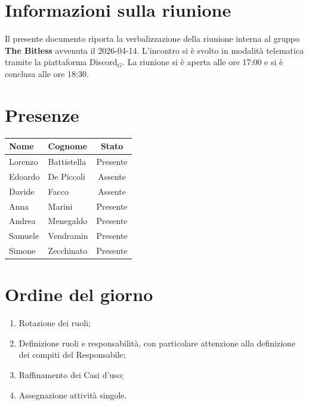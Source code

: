 \documentclass[a4paper, 10pt, colorlinks=true, linkcolor=black, urlcolor=blue, citecolor=blue, hidelinks]{article}
\begin{document}
\newcommand{\titolo}{Verbale interno}
\newcommand{\dataverbale}{2026-04-14}
\newcommand{\dataversione}{2026-04-19}
\newcommand{\versione}{1.0.0}
\newcommand{\stato}{Stesura}
\newcommand{\destinatari}{The Bitless, prof. Tullio Vardanega, prof. Riccardo Cardin}
\def\templatedir{../../../../templates}

\begin{titlepage}

\end{titlepage}
\newpage
\tableofcontents 

\newpage
\section{Informazioni sulla riunione}
Il presente documento riporta la verbalizzazione della riunione interna al gruppo \textbf{The Bitless} avvenuta il \dataverbale{}. L'incontro si è svolto in modalità telematica tramite la piattaforma Discord$_G$. La riunione si è aperta alle ore 17:00 e si è conclusa alle ore 18:30.

\section{Presenze}
\begin{center}
\begin{tabular}{|l|l|c|}
\hline
\textbf{Nome} & \textbf{Cognome} & \textbf{Stato} \\
\hline
Lorenzo & Battistella & Presente \\
Edoardo & De Piccoli & Assente \\
Davide & Facco & Assente \\
Anna & Marini & Presente \\
Andrea & Menegaldo & Presente \\
Samuele & Vendramin & Presente \\
Simone & Zecchinato & Presente \\
\hline
\end{tabular}
\end{center}

\section{Ordine del giorno}
\begin{enumerate}
    \item Rotazione dei ruoli;
    \item Definizione ruoli e responsabilità, con particolare attenzione alla definizione dei compiti del Responsabile;
    \item Raffinamento dei Casi d'uso;
    \item Assegnazione attività singole.
\end{enumerate}
\end{document}
